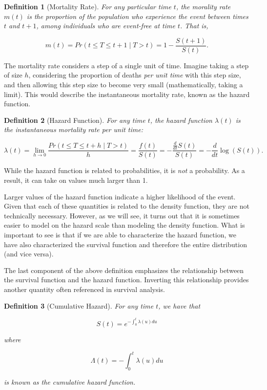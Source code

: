 \documentclass[
]{book}
\theoremstyle{plain}
\theoremstyle{mydefn}
\newtheorem{definition}{Definition}[chapter]
\theoremstyle{myexmpl}
\theoremstyle{remark}
\begin{document}
\begin{definition}[Mortality Rate]
For any particular time \(t\), the morality rate \(m(t)\) is the proportion of the population who experience the event between times \(t\) and \(t + 1\), among individuals who are event-free at time \(t\). That is,

\[m(t) = Pr(t \leq T \leq t + 1 \mid T > t) = 1 - \frac{S(t + 1)}{S(t)}.\]
\end{definition}

The mortality rate considers a step of a single unit of time. Imagine taking a step of size \(h\), considering the proportion of deaths \emph{per unit time} with this step size, and then allowing this step size to become very small (mathematically, taking a limit). This would describe the instantaneous mortality rate, known as the hazard function.

\begin{definition}[Hazard Function]
For any time \(t\), the hazard function \(\lambda(t)\) is the instantaneous mortality rate per unit time:

\[\lambda(t) = \lim_{h \rightarrow 0} \frac{Pr(t \leq T \leq t + h \mid T > t)}{h} = \frac{f(t)}{S(t)} = -  \frac{\frac{d}{dt} S(t)}{S(t)} = -\frac{d}{dt} \log(S(t)).\]
\end{definition}

\begin{rmdwarning}
While the hazard function is related to probabilities, it is \emph{not} a probability. As a result, it can take on values much larger than 1.\\
\end{rmdwarning}

Larger values of the hazard function indicate a higher likelihood of the event. Given that each of these quantities is related to the density function, they are not technically necessary. However, as we will see, it turns out that it is sometimes easier to model on the hazard scale than modeling the density function. What is important to see is that if we are able to characterize the hazard function, we have also characterized the survival function and therefore the entire distribution (and vice versa).

The last component of the above definition emphasizes the relationship between the survival function and the hazard function. Inverting this relationship provides another quantity often referenced in survival analysis.

\begin{definition}[Cumulative Hazard]
For any time \(t\), we have that

\[S(t) = e^{-\int_{0}^{t} \lambda(u) du}\]

where

\[\Lambda(t) = -\int_{0}^{t} \lambda(u) du\]

is known as the cumulative hazard function.
\end{definition}
\end{document}
